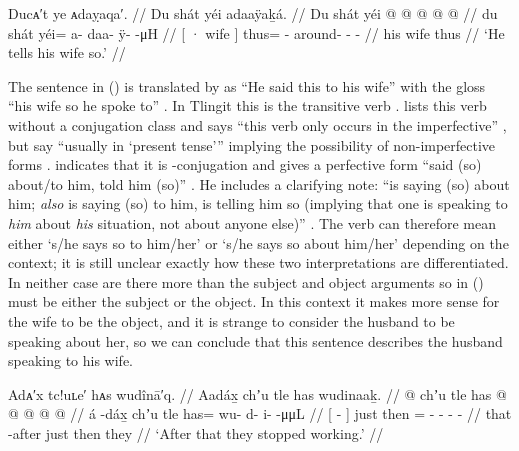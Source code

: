 \ex\label{ex:100-20-tells-wife}%
%
\begingl
	\glpreamble	Ducᴀ′t ye ᴀdaỵaqa′. //
	\glpreamble	Du shát yéi adaaÿaḵá. //
	\gla	{} Du shát {} yéi @  @ {} @ {} @ {} @ {} //
	\glb	{} du shát {} yéi= a- daa- ÿ-  -μH //
	\glc	{}[ · wife {}] thus= - around- -   - //
	\gld	{} his wife {} thus  {} {} {} {} {} {} {} {} //
	\glft	‘He tells his wife so.’
		//
\endgl
\xe

The sentence in (\lastx) is translated by \citeauthor{swanton:1909} as “He said this to his wife” with the gloss “his wife so he spoke to” \parencite[311]{swanton:1909}.
In Tlingit this is the transitive verb .
\citeauthor{edwards:2009} lists this verb without a conjugation class and says “this verb only occurs in the imperfective” \parencite[162]{edwards:2009}, but \citeauthor{story-naish:1973} say “usually in ‘present tense’” implying the possibility of non-imperfective forms \parencite[225]{story-naish:1973}.
\citeauthor{leer:1976} indicates that it is -conjugation and gives a perfective form  “said (so) about/to him, told him (so)” \parencite[858]{leer:1976}.
He includes a clarifying note: “is saying (so) about him; \emph{also} is saying (so) to him, is telling him so (implying that one is speaking to \emph{him} about \emph{his} situation, not about anyone else)” \parencite[858]{leer:1976}.
The verb can therefore mean either ‘s/he says so to him/her’ or ‘s/he says so about him/her’ depending on the context; it is still unclear exactly how these two interpretations are differentiated.
In neither case are there more than the subject and object arguments so  in (\lastx) must be either the subject or the object.
In this context it makes more sense for the wife to be the object, and it is strange to consider the husband to be speaking about her, so we can conclude that this sentence describes the husband speaking to his wife.

\ex\label{ex:100-21-stop-work}%
%
\begingl
	\glpreamble	Adᴀ′x tc!uʟe′ hᴀs wudînā′q. //
	\glpreamble	Aadáx̱ chʼu tle has wudinaaḵ. //
	\gla	{}  @ {} {}
		chʼu tle
		has @  @ {} @ {} @ {} @ {}  //
	\glb	{} á -dáx̱ {} 
		chʼu tle
		has= wu- d- i-  -μμL //
	\glc	{}[  - {}]
		just then
		= - - -  - //
	\gld	{} that -after {} 
		just then
		they  {} {} {} {} //
	\glft	‘After that they stopped working.’
		//
\endgl
\xe

